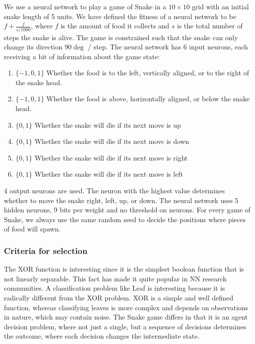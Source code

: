 We use a neural network to play a game of Snake in a $10\times10$ grid with an initial snake length of 5 units.
We have defined the fitness of a neural network to be $f + \frac{f}{s/1000}$,
where $f$ is the amount of food it collects and $s$ is the total number of steps the snake is alive.
The game is constrained such that the snake can only change its direction $90\deg$ / step.
The neural network has 6 input neurons, each receiving a bit of information about the game state:
\begin{enumerate}
\item $\{-1, 0, 1\}$ Whether the food is to the left, vertically aligned, or to the right of the snake head.
\item $\{-1, 0, 1\}$ Whether the food is above, horizontally aligned, or below the snake head.
\item $\{0, 1\}$ Whether the snake will die if its next move is up
\item $\{0, 1\}$ Whether the snake will die if its next move is down
\item $\{0, 1\}$ Whether the snake will die if its next move is right
\item $\{0, 1\}$ Whether the snake will die if its next move is left
\end{enumerate}
4 output neurons are used. The neuron with the highest value determines whether to move the snake right, left, up, or down.
The neural network uses 5 hidden neurons, 9 bits per weight and no threshold on neurons.
For every game of Snake, we always use the same random seed to decide the positions where pieces of food will spawn.

\subsubsection{Criteria for selection}
The XOR function is interesting since it is the simplest boolean function that is not linearly separable.
This fact has made it quite popular in NN research communities\cite{masterThesisGANN}.
A classification problem like Leaf is interesting because it is radically different from the XOR problem.
XOR is a simple and well defined function, whereas classifying leaves is more complex and depends on observations in nature, which may contain noise.
The Snake game differs in that it is an agent decision problem, where not just a single, but a sequence of decisions determines the outcome, where each decision changes the intermediate state.